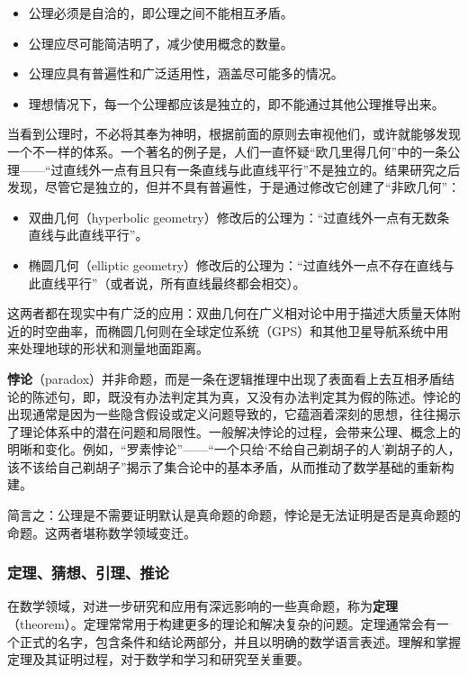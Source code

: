 \begin{itemize}
\item 公理必须是自洽的，即公理之间不能相互矛盾。
\item 公理应尽可能简洁明了，减少使用概念的数量。
\item 公理应具有普遍性和广泛适用性，涵盖尽可能多的情况。
\item 理想情况下，每一个公理都应该是独立的，即不能通过其他公理推导出来。
\end{itemize}

当看到公理时，不必将其奉为神明，根据前面的原则去审视他们，或许就能够发现一个不一样的体系。一个著名的例子是，人们一直怀疑“欧几里得几何”中的一条公理——“过直线外一点有且只有一条直线与此直线平行”不是独立的。结果研究之后发现，尽管它是独立的，但并不具有普遍性，于是通过修改它创建了“非欧几何”：

\begin{itemize}
\item 双曲几何（hyperbolic geometry）修改后的公理为：“过直线外一点有无数条直线与此直线平行”。
\item 椭圆几何（elliptic geometry）修改后的公理为：“过直线外一点不存在直线与此直线平行”（或者说，所有直线最终都会相交）。
\end{itemize}

这两者都在现实中有广泛的应用：双曲几何在广义相对论中用于描述大质量天体附近的时空曲率，而椭圆几何则在全球定位系统（GPS）和其他卫星导航系统中用来处理地球的形状和测量地面距离。

\textbf{悖论}（paradox）并非命题，而是一条在逻辑推理中出现了表面看上去互相矛盾结论的陈述句，即，既没有办法判定其为真，又没有办法判定其为假的陈述。悖论的出现通常是因为一些隐含假设或定义问题导致的，它蕴涵着深刻的思想，往往揭示了理论体系中的潜在问题和局限性。一般解决悖论的过程，会带来公理、概念上的明晰和变化。例如，“罗素悖论”——“一个只给‘不给自己剃胡子的人’剃胡子的人，该不该给自己剃胡子”揭示了集合论中的基本矛盾，从而推动了数学基础的重新构建。

简言之：公理是不需要证明默认是真命题的命题，悖论是无法证明是否是真命题的命题。这两者堪称数学领域变迁。

\subsubsection{定理、猜想、引理、推论}

在数学领域，对进一步研究和应用有深远影响的一些真命题，称为\textbf{定理}（theorem）。定理常常用于构建更多的理论和解决复杂的问题。定理通常会有一个正式的名字，包含条件和结论两部分，并且以明确的数学语言表述。理解和掌握定理及其证明过程，对于数学和学习和研究至关重要。


